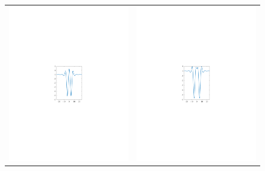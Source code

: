 \documentclass[thesis.tex]{subfiles}
\begin{document}
\begin{figure}
\begin{tabular}{cc}
\includegraphics{images/other/double1}&
\includegraphics{images/other/double2}

\end{tabular}
\end{figure}
\end{document}
